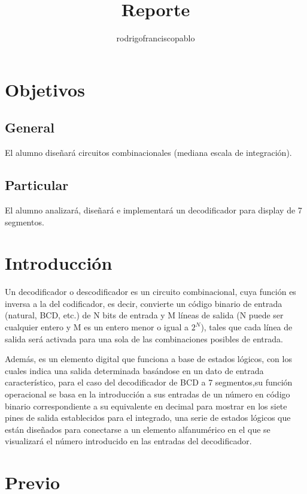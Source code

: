 \documentclass{mylib/reporteConCalif}
\title{Reporte}
\author{rodrigofranciscopablo }
\begin{document}
\coverPage

\section{Objetivos}

\subsection{General}

El alumno diseñará circuitos combinacionales (mediana escala de integración).

\subsection{Particular}

El alumno analizará, diseñará e implementará un decodificador para display de 7 segmentos.

\section{Introducción}

Un decodificador o descodificador es un circuito combinacional, cuya función es inversa a la del codificador, es decir, convierte un código binario de entrada (natural, BCD, etc.) de N bits de entrada y M líneas de salida (N puede ser cualquier entero y M es un entero menor o igual a $2^N$), tales que cada línea de salida será activada para una sola de las combinaciones posibles de entrada.

Además, es un elemento digital que funciona a base de estados lógicos, con los cuales indica una salida determinada basándose en un dato de entrada característico, para el caso del decodificador de BCD a 7 segmentos,su función operacional se basa en la introducción a sus entradas de un número en código binario correspondiente a su equivalente en decimal para mostrar en los siete pines de salida establecidos para el integrado, una serie de estados lógicos que están diseñados para conectarse a un elemento alfanumérico en el que se visualizará el número introducido en las entradas del decodificador.


\newpage
\section{Previo}
\end{document}

